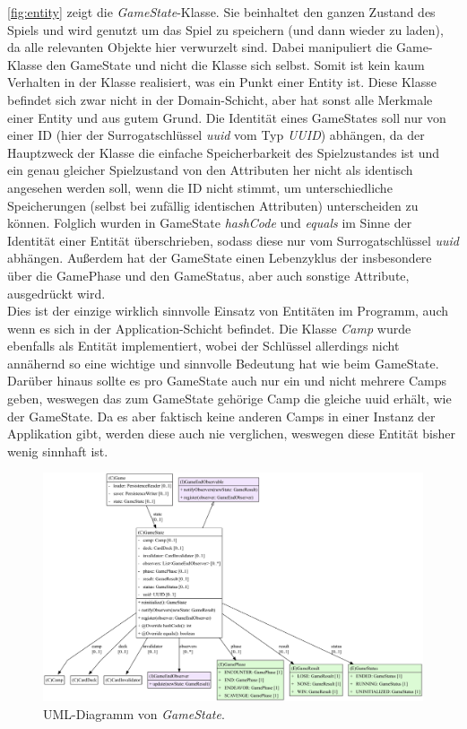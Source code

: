 \autoref{fig:entity} zeigt die \textit{GameState}-Klasse. Sie beinhaltet den ganzen Zustand des Spiels und wird genutzt 
um das Spiel zu speichern (und dann wieder zu laden), da alle relevanten Objekte hier verwurzelt sind. Dabei manipuliert die Game-Klasse
den GameState und nicht die Klasse sich selbst. Somit ist kein kaum Verhalten in der Klasse realisiert, was ein Punkt einer Entity ist. 
Diese Klasse befindet sich zwar nicht in der Domain-Schicht, aber hat sonst alle Merkmale einer Entity und aus gutem Grund. 
Die Identität eines GameStates soll nur von einer ID (hier der Surrogatschlüssel \textit{uuid} vom Typ \textit{UUID}) abhängen, 
da der Hauptzweck der Klasse die einfache Speicherbarkeit des Spielzustandes ist und ein genau gleicher Spielzustand von den Attributen her 
nicht als identisch angesehen werden soll, wenn die ID nicht stimmt, um unterschiedliche Speicherungen (selbst bei zufällig identischen Attributen)
unterscheiden zu können. Folglich wurden in GameState \textit{hashCode} und \textit{equals} im Sinne der Identität einer Entität überschrieben, 
sodass diese nur vom Surrogatschlüssel \textit{uuid} abhängen. Außerdem hat der GameState einen Lebenzyklus der insbesondere über 
die GamePhase und den GameStatus, aber auch sonstige Attribute, ausgedrückt wird. \\ 
Dies ist der einzige wirklich sinnvolle Einsatz von Entitäten im Programm, auch wenn es sich in der Application-Schicht befindet. 
Die Klasse \textit{Camp} wurde ebenfalls als Entität implementiert, wobei der Schlüssel allerdings nicht annähernd so eine wichtige 
und sinnvolle Bedeutung hat wie beim GameState. Darüber hinaus sollte es pro GameState auch nur ein und nicht mehrere Camps geben, 
weswegen das zum GameState gehörige Camp die gleiche uuid erhält, wie der GameState. Da es aber faktisch keine anderen Camps in einer 
Instanz der Applikation gibt, werden diese auch nie verglichen, weswegen diese Entität bisher wenig sinnhaft ist. 

\begin{figure}[H]
	\centering
	\includegraphics[width=1.05\textwidth]{Bilder/GameState_structure.pdf} 
	\caption{UML-Diagramm von \textit{GameState}.}
	\label{fig:entity}
\end{figure} 

